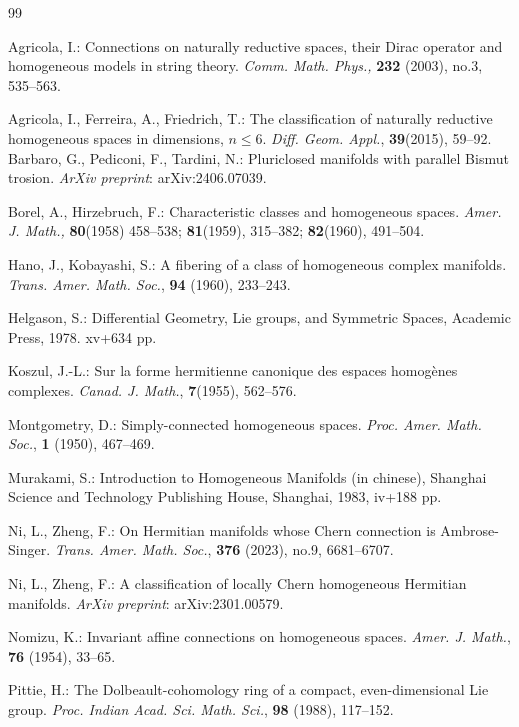 \documentclass{amse-new}
\numberwithin{equation}{section} %
\begin{document}
\begin{thebibliography}{99}

 Agricola, I.: Connections on naturally reductive spaces, their Dirac operator and homogeneous models in string theory. \emph{Comm. Math. Phys.,} \textbf{232} (2003), no.3,  535--563.

 Agricola, I., Ferreira, A., Friedrich, T.: The classification of naturally reductive homogeneous spaces in dimensions, $n\le 6$. \emph{ Diff. Geom. Appl.}, \textbf{39}(2015), 59--92.
 Barbaro, G., Pediconi, F.,   Tardini, N.: Pluriclosed
manifolds with parallel Bismut trosion. \emph{ArXiv preprint}: arXiv:2406.07039.

 Borel, A., Hirzebruch, F.: Characteristic classes and homogeneous spaces. \emph{Amer. J. Math.,} \textbf{80}(1958) 458--538; \textbf{81}(1959), 315--382; \textbf{82}(1960), 491--504.

Hano, J., Kobayashi, S.:  A fibering of a class of
homogeneous complex manifolds. \emph{ Trans. Amer. Math. Soc.}, \textbf{94} (1960), 233--243.

 Helgason, S.: Differential Geometry, Lie groups, and Symmetric Spaces, Academic Press, 1978. xv+634 pp.

 Koszul, J.-L.: Sur la forme hermitienne canonique des
espaces homog\`enes complexes. \emph{Canad. J. Math.}, \textbf{7}(1955), 562--576.

 Montgometry, D.: Simply-connected homogeneous
spaces. \emph{ Proc. Amer. Math. Soc.}, \textbf{1} (1950), 467--469.

 Murakami, S.:  Introduction to Homogeneous Manifolds (in chinese),
Shanghai Science and Technology Publishing House, Shanghai, 1983, iv+188 pp.

  Ni, L.,  Zheng, F.: On Hermitian manifolds whose Chern connection is Ambrose-Singer. \emph{ Trans. Amer. Math. Soc.}, \textbf{376} (2023), no.9, 6681--6707.

  Ni, L., Zheng, F.: A classification of locally Chern homogeneous Hermitian manifolds. 	\emph{ArXiv preprint}: arXiv:2301.00579.

      Nomizu, K.:  Invariant affine connections on homogeneous spaces. \emph{ Amer. J. Math.}, \textbf{76} (1954), 33--65.

 Pittie, H.: The Dolbeault-cohomology ring of a
compact, even-dimensional Lie group. \emph{ Proc. Indian Acad. Sci. Math. Sci.},  \textbf{98}%
(1988), 117--152.


\end{thebibliography}
\end{document}
